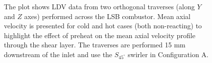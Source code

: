 \begin{figure}

\centering



\caption[Effect of preheat temperature on the LSB flow field - II]{The plot shows LDV data from two orthogonal traverses (along \(Y\) and \(Z\) axes) performed across the LSB combustor. Mean axial velocity is presented for cold and hot cases (both non-reacting) to highlight the effect of preheat on the mean axial velocity profile through the shear layer. The traverses are performed 15 mm downstream of the inlet and use the \(S_{45^\circ}\) swirler in Configuration A.}

\label{fig:temperatureLDVTransverse}

\end{figure}

